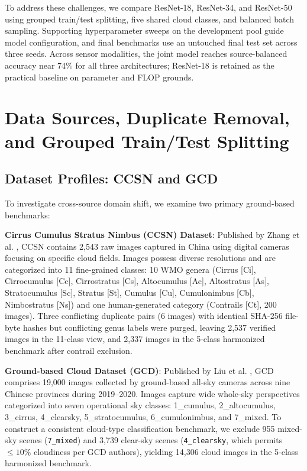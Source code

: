 \documentclass[11pt,a4paper]{article}
\begin{document}
To address these challenges, we compare ResNet-18, ResNet-34, and ResNet-50 \cite{he2016deep} using grouped train/test splitting, five shared cloud classes, and balanced batch sampling. Supporting hyperparameter sweeps on the development pool guide model configuration, and final benchmarks use an untouched final test set across three seeds. Across sensor modalities, the joint model reaches source-balanced accuracy near 74\% for all three architectures; ResNet-18 is retained as the practical baseline on parameter and FLOP grounds.

\section{Data Sources, Duplicate Removal, and Grouped Train/Test Splitting}
\label{sec:data_curation}

\subsection{Dataset Profiles: CCSN and GCD}

To investigate cross-source domain shift, we examine two primary ground-based benchmarks:

\textbf{Cirrus Cumulus Stratus Nimbus (CCSN) Dataset}: Published by Zhang et al. \cite{zhang2018cloud}, CCSN contains 2,543 raw images captured in China using digital cameras focusing on specific cloud fields. Images possess diverse resolutions and are categorized into 11 fine-grained classes: 10 WMO genera (Cirrus [Ci], Cirrocumulus [Cc], Cirrostratus [Cs], Altocumulus [Ac], Altostratus [As], Stratocumulus [Sc], Stratus [St], Cumulus [Cu], Cumulonimbus [Cb], Nimbostratus [Ns]) and one human-generated category (Contrails [Ct], 200 images). Three conflicting duplicate pairs (6 images) with identical SHA-256 file-byte hashes but conflicting genus labels were purged, leaving 2,537 verified images in the 11-class view, and 2,337 images in the 5-class harmonized benchmark after contrail exclusion.

\textbf{Ground-based Cloud Dataset (GCD)}: Published by Liu et al. \cite{liu2022ground}, GCD comprises 19,000 images collected by ground-based all-sky cameras across nine Chinese provinces during 2019--2020. Images capture wide whole-sky perspectives categorized into seven operational sky classes: 1\_cumulus, 2\_altocumulus, 3\_cirrus, 4\_clearsky, 5\_stratocumulus, 6\_cumulonimbus, and 7\_mixed. To construct a consistent cloud-type classification benchmark, we exclude 955 mixed-sky scenes (\texttt{7\_mixed}) and 3,739 clear-sky scenes (\texttt{4\_clearsky}, which permits $\le 10\%$ cloudiness per GCD authors), yielding 14,306 cloud images in the 5-class harmonized benchmark.
\end{document}
